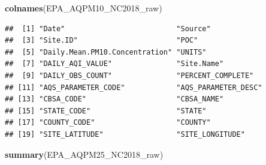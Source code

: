 \documentclass[12pt,]{article}
\newenvironment{Shaded}{\begin{snugshade}}{\end{snugshade}}
\newcommand{\KeywordTok}[1]{\textcolor[rgb]{0.13,0.29,0.53}{\textbf{#1}}}
\newcommand{\NormalTok}[1]{#1}
\begin{document}
\begin{Shaded}
\begin{Highlighting}[]
\KeywordTok{colnames}\NormalTok{(EPA_AQPM10_NC2018_raw)}
\end{Highlighting}
\end{Shaded}

\begin{verbatim}
##  [1] "Date"                          "Source"                       
##  [3] "Site.ID"                       "POC"                          
##  [5] "Daily.Mean.PM10.Concentration" "UNITS"                        
##  [7] "DAILY_AQI_VALUE"               "Site.Name"                    
##  [9] "DAILY_OBS_COUNT"               "PERCENT_COMPLETE"             
## [11] "AQS_PARAMETER_CODE"            "AQS_PARAMETER_DESC"           
## [13] "CBSA_CODE"                     "CBSA_NAME"                    
## [15] "STATE_CODE"                    "STATE"                        
## [17] "COUNTY_CODE"                   "COUNTY"                       
## [19] "SITE_LATITUDE"                 "SITE_LONGITUDE"
\end{verbatim}

\begin{Shaded}
\begin{Highlighting}[]
\KeywordTok{summary}\NormalTok{(EPA_AQPM25_NC2018_raw)}
\end{Highlighting}
\end{Shaded}
\end{document}
